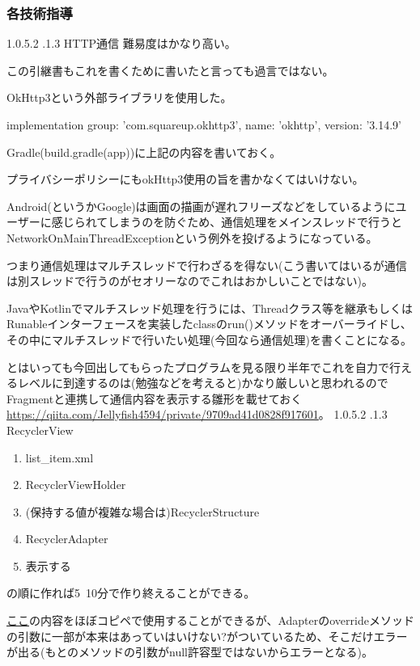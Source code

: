 \documentclass[dvipdfmx,jb5]{jarticle}
\makeatletter
\newcommand{\subsubsubsection}{\@startsection{paragraph}{4}{\z@}%
    {1.0\Cvs \@plus.5\Cdp \@minus.2\Cdp}%
    {.1\Cvs \@plus.3\Cdp}%
    {\reset@font}
  }
\newcommand{\link}[2]{\href{#2}{#1}}
\makeatother
\begin{document}
\subsubsection{各技術指導}
 \subsubsubsection{HTTP通信}
 難易度はかなり高い。\par
 この引継書もこれを書くために書いたと言っても過言ではない。\par
 OkHttp3という外部ライブラリを使用した。\par
 implementation group: 'com.squareup.okhttp3', name: 'okhttp', version: '3.14.9'\par
 Gradle(build.gradle(app))に上記の内容を書いておく。\par
 プライバシーポリシーにもokHttp3使用の旨を書かなくてはいけない。\par
 Android(というかGoogle)は画面の描画が遅れフリーズなどをしているようにユーザーに感じられてしまうのを防ぐため、通信処理をメインスレッドで行うとNetworkOnMainThreadExceptionという例外を投げるようになっている。\par
 つまり通信処理はマルチスレッドで行わざるを得ない(こう書いてはいるが通信は別スレッドで行うのがセオリーなのでこれはおかしいことではない)。\par
 JavaやKotlinでマルチスレッド処理を行うには、Threadクラス等を継承もしくはRunableインターフェースを実装したclassのrun()メソッドをオーバーライドし、その中にマルチスレッドで行いたい処理(今回なら通信処理)を書くことになる。\par
 とはいっても今回出してもらったプログラムを見る限り半年でこれを自力で行えるレベルに到達するのは(勉強などを考えると)かなり厳しいと思われるのでFragmentと連携して通信内容を表示する雛形を載せておく{\ttfamily \url{https://qiita.com/Jellyfish4594/private/9709ad41d0828f917601}}。
 \subsubsubsection{RecyclerView}
 \begin{enumerate}
 \item list\_item.xml
 \item RecyclerViewHolder
 \item (保持する値が複雑な場合は)RecyclerStructure
 \item RecyclerAdapter
 \item 表示する
 \end{enumerate}
 の順に作れば5~10分で作り終えることができる。\par
 \link{ここ}{https://qiita.com/Todate/items/297bc3e4d0f3d2477ed3}の内容をほぼコピペで使用することができるが、Adapterのoverrideメソッドの引数に一部が本来はあっていはいけない?がついているため、そこだけエラーが出る(もとのメソッドの引数がnull許容型ではないからエラーとなる)。
\end{document}
